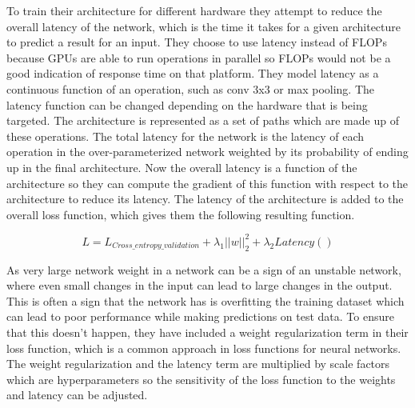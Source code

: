 \documentclass{ieee}
\begin{document}
To train their architecture for different hardware they attempt to reduce the overall latency of the network, which is the time it takes for a given architecture to predict a result for an input. They choose to use latency instead of FLOPs because GPUs are able to run operations in parallel so FLOPs would not be a good indication of response time on that platform. They model latency as a continuous function of an operation, such as conv 3x3 or max pooling. The latency function can be changed depending on the hardware that is being targeted. The architecture is represented as a set of paths which are made up of these operations. The total latency for the network is the latency of each operation in the over-parameterized network weighted by its probability of ending up in the final architecture. Now the overall latency is a function of the architecture so they can compute the gradient of this function with respect to the architecture to reduce its latency. The latency of the architecture is added to the overall loss function, which gives them the following resulting function. 

\begin{equation}
    L = L_{Cross\_entropy\_validation} + \lambda_1 ||w||_2^2 + \lambda_2Latency()
\end{equation}

As very large network weight in a network can be a sign of an unstable network, where even small changes in the input can lead to large changes in the output. This is often a sign that the network has is overfitting the training dataset which can lead to poor performance while making predictions on test data. To ensure that this doesn't happen, they have included a weight regularization term in their loss function, which is a common approach in loss functions for neural networks. The weight regularization and the latency term are multiplied by scale factors which are hyperparameters so the sensitivity of the loss function to the weights and latency can be adjusted.
\end{document}
